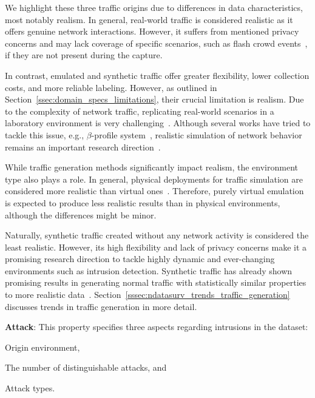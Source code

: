We highlight these three traffic origins due to differences in data characteristics, most notably realism. In general, real-world traffic is considered realistic as it offers genuine network interactions. However, it suffers from mentioned privacy concerns and may lack coverage of specific scenarios, such as flash crowd events~\cite{ari2003_flash_crowds}, if they are not present during the capture.

In contrast, emulated and synthetic traffic offer greater flexibility, lower collection costs, and more reliable labeling. However, as outlined in Section~\ref{ssec:domain_specs_limitations}, their crucial limitation is realism. Due to the complexity of network traffic, replicating real-world scenarios in a laboratory environment is very challenging~\cite{catillo2023_ml_public_ids_datasets}. Although several works have tried to tackle this issue, e.g., $\beta$-profile system~\cite{shiravi2012_iscx2012}, realistic simulation of network behavior remains an important research direction~\cite{hindy2020_network_threats_taxonomy}.

While traffic generation methods significantly impact realism, the environment type also plays a role. In general, physical deployments for traffic simulation are considered more realistic than virtual ones~\cite{chou2020_datadriven_nids}. Therefore, purely virtual emulation is expected to produce less realistic results than in physical environments, although the differences might be minor.

Naturally, synthetic traffic created without any network activity is considered the least realistic. However, its high flexibility and lack of privacy concerns make it a promising research direction to tackle highly dynamic and ever-changing environments such as intrusion detection. Synthetic traffic has already shown promising results in generating normal traffic with statistically similar properties to more realistic data~\cite{schoen2024_tale_two_methods}. Section~\ref{sssec:ndatasurv_trends_traffic_generation} discusses trends in traffic generation in more detail.

\textbf{Attack}: This property specifies three aspects regarding intrusions in the dataset:
\begin{enumerate*}[label={\arabic*)}]
    \item Origin environment,
    \item The number of distinguishable attacks, and
    \item Attack types.
\end{enumerate*}

